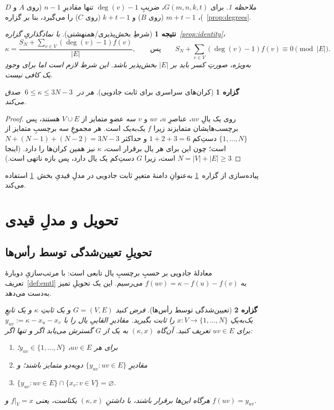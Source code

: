 \documentclass[11pt,a4paper]{article}
\newcommand{\en}[1]{\lr{{\enfont #1}}}
\newcommand{\km}{\kappa}
\newcommand{\Gfam}{G(m,n,k,t)}
\DeclareMathOperator{\degr}{deg}
\theoremstyle{plain}
\newtheorem{proposition}{گزاره}
\newtheorem{corollary}{نتیجه}
\theoremstyle{definition}
\theoremstyle{remark}
\newtheorem*{remark}{ملاحظه}
\begin{document}
\begin{remark}
برای $\Gfam$، ضریبِ $\degr(v)-1$ تنها مقادیرِ $n-1$ (روی $A$ و $D$)، $m+t-1$ (روی $B$)
و $k+t-1$ (روی $C$) را می‌گیرد، بنا بر گزاره~\ref{prop:degrees}.
\end{remark}

\begin{corollary}[شرطِ بخش‌پذیری/همنهشتی]\label{cor:divis}
با نمادگذاریِ گزاره~\ref{prop:identity}،
\[
  \km=\frac{S_N+\sum_{v\in V}(\degr(v)-1)f(v)}{|E|},
  \qquad\text{پس}\qquad
  S_N+\sum_{v\in V}(\degr(v)-1)f(v)\equiv 0 \pmod{|E|}.
\]
به‌ویژه، صورتِ کسر باید بر $|E|$ بخش‌پذیر باشد. این شرط لازم است اما برای وجودِ یک
\en{EMTL} کافی نیست.
\end{corollary}

\begin{proposition}[کران‌های سراسری برای ثابت جادویی]\label{prop:bounds}
هر \en{EMTL} در $\;6\le \km\le 3N-3\;$ صدق می‌کند.
\end{proposition}

\begin{proof}
روی یک یالِ $uv$، عناصرِ $u$، $uv$ و $v$ سه عضوِ متمایز از $V\cup E$ هستند، پس
برچسب‌هایشان متمایزند زیرا $f$ یک‌به‌یک است. هر مجموعِ سه برچسبِ متمایز از
$\{1,\dots,N\}$ دستِ‌کم $1+2+3=6$ و حداکثر $N+(N-1)+(N-2)=3N-3$ است؛ چون این برای هر
یال برقرار است، $\km$ نیز همین کران‌ها را دارد. (اینجا $N=|V|+|E|\ge 3$ است، زیرا $G$
دستِ‌کم یک یال دارد، پس بازه ناتهی است.)
\end{proof}

پیاده‌سازی از گزاره~\ref{prop:bounds} به‌عنوانِ دامنهٔ متغیرِ ثابت جادویی در مدلِ
قیدیِ بخش~\ref{sec:model} استفاده می‌کند.

\section{تحویل و مدلِ قیدی}\label{sec:model}

\subsection{تحویلِ تعیین‌شدگی توسط رأس‌ها}

معادلهٔ جادویی بر حسبِ برچسبِ یال تابعی است: با مرتب‌سازیِ دوبارهٔ تعریف~\ref{def:emtl}
به $f(uv)=\km-f(u)-f(v)$ می‌رسیم. این یک تحویلِ تمیز به‌دست می‌دهد.

\begin{proposition}[تعیین‌شدگی توسط رأس‌ها]\label{prop:reduction}
فرض کنید $G=(V,E)$ و یک ثابتِ $\km$ و یک تابعِ یک‌به‌یکِ
$x\colon V\to\{1,\dots,N\}$ را ثابت بگیرید. مقادیرِ القاییِ یال را با
$y_{uv}:=\km-x_u-x_v$ برای $uv\in E$ تعریف کنید. آن‌گاه $(\km,x)$ به یک \en{EMTL} از
$G$ گسترش می‌یابد اگر و تنها اگر:
\begin{enumerate}[label=(\alph*),itemsep=1pt]
  \item برای هر $uv\in E$، $y_{uv}\in\{1,\dots,N\}$؛
  \item مقادیرِ $\{y_{uv}:uv\in E\}$ دوبه‌دو متمایز باشند؛ و
  \item $\{y_{uv}:uv\in E\}\cap\{x_v:v\in V\}=\varnothing$.
\end{enumerate}
هرگاه این‌ها برقرار باشند، \en{EMTL} با داشتنِ $(\km,x)$ یکتاست، یعنی $f|_V=x$ و
$f(uv)=y_{uv}$.
\end{proposition}
\end{document}
